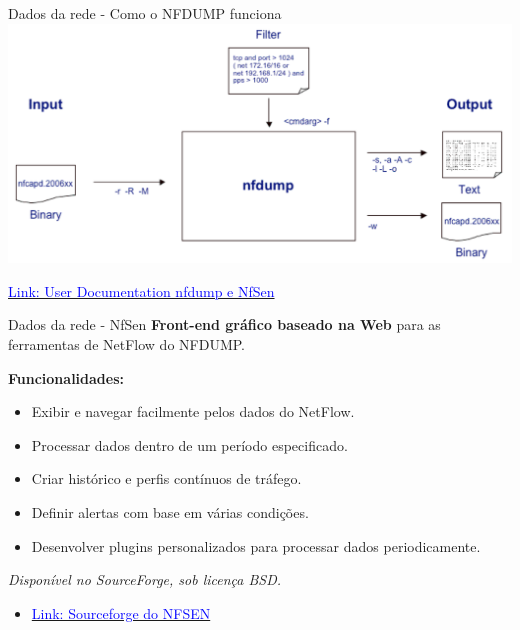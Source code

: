 \begin{frame}{Dados da rede - Como o NFDUMP funciona}
    \centering
    \includegraphics[width=0.85\linewidth]{Figuras/nfdump-filtros-processando.png}
    \vspace{0.3cm}


\href{https://www.first.org/resources/papers/conference2006/haag-peter-papers.pdf}{\textcolor{blue}{Link: User Documentation nfdump e NfSen}}

\end{frame}

\begin{frame}{Dados da rede - NfSen}
\textbf{Front-end gráfico baseado na Web} para as ferramentas de NetFlow do NFDUMP.

\vspace{0.5cm}
\textbf{Funcionalidades:}
\begin{itemize}
    \item Exibir e navegar facilmente pelos dados do NetFlow.
    \item Processar dados dentro de um período especificado.
    \item Criar histórico e perfis contínuos de tráfego.
    \item Definir alertas com base em várias condições.
    \item Desenvolver plugins personalizados para processar dados periodicamente.
\end{itemize}

\vspace{0.5cm}
\textit{Disponível no SourceForge, sob licença BSD.}

\begin{itemize}
    \item \href{https://sourceforge.net/projects/nfsen/}{\textcolor{blue}{Link: Sourceforge do NFSEN}}
\end{itemize}

\end{frame}

